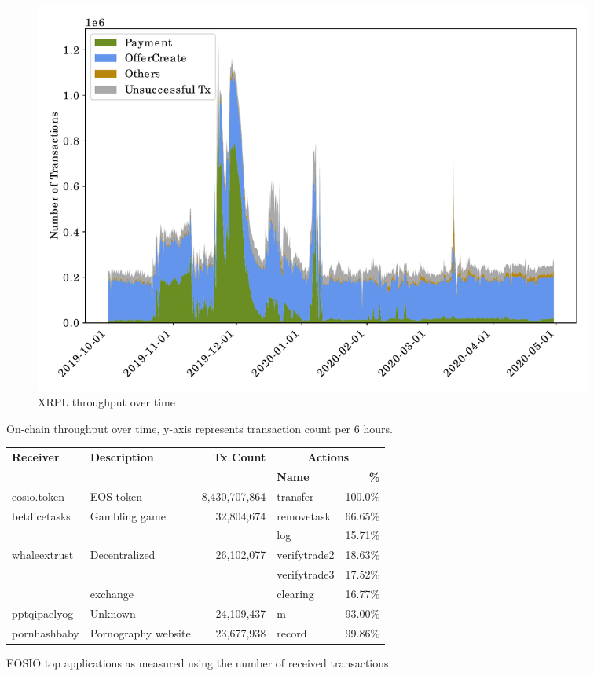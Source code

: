 \begin{figure}[tbp]
\begin{subfigure}{\columnwidth}
        \includegraphics[height=.27\textheight]{./4-transactions-security/figures/xrp-chart-area.pdf}
        \caption{XRPL throughput over time}
        \label{fig:xrp-throughput-time}
    \end{subfigure}
    \caption{On-chain throughput over time, y-axis represents transaction count per 6 hours.}
    \label{fig:throughput-time}
\end{figure}

\begin{figure}[tb]
    \scriptsize
    \centering
    \setlength{\tabcolsep}{2pt}
    \begin{tabular}{l l r l r}
    \toprule
    \textbf{Receiver} & \textbf{Description} & \textbf{Tx Count} & \multicolumn{2}{c}{\bf Actions}\\
         &         &    &  \bf Name   & \bf \% \\
    \midrule
      eosio.token & EOS token & 8,430,707,864 & transfer & 100.0\%\\
      \midrule
      \multirow{2}{*}{betdicetasks} & \multirow{2}{*}{Gambling game} & \multirow{2}{*}{32,804,674} & removetask & 66.65\%\\
                      & & & log & 15.71\%\\
      \midrule
      \multirow{3}{*}{whaleextrust} & \multirow{2}{*}{Decentralized} & \multirow{3}{*}{26,102,077} & verifytrade2 & 18.63\%\\
                      & & & verifytrade3 & 17.52\%\\
                      & exchange & & clearing & 16.77\%\\
      \midrule
      pptqipaelyog & Unknown & 24,109,437 & m & 93.00\%\\
      \midrule
      pornhashbaby & Pornography website & 23,677,938 & record & 99.86\%\\
    \bottomrule
    \end{tabular}
    \caption{EOSIO top applications as measured using the number of received transactions.}
    \label{tab:eos-top-applications}
    \vspace{-0.3cm}
\end{figure}


